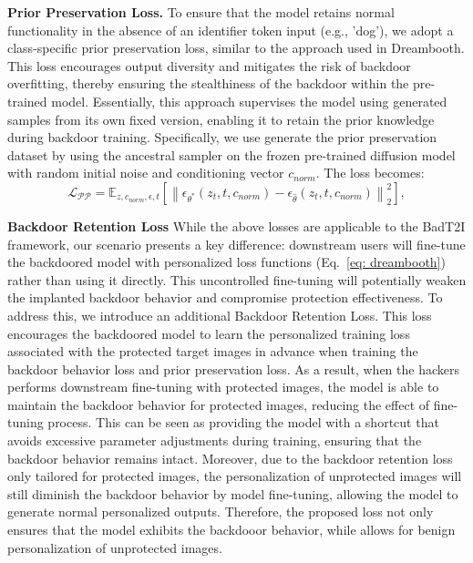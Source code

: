 \noindent \textbf{Prior Preservation Loss.}
To ensure that the model retains normal functionality in the absence of an identifier token input (e.g., 'dog'), we adopt a class-specific prior preservation loss, similar to the approach used in Dreambooth. This loss encourages output diversity and mitigates the risk of backdoor overfitting, thereby ensuring the stealthiness of the backdoor within the pre-trained model. Essentially, this approach supervises the model using generated samples from its own fixed version, enabling it to retain the prior knowledge during backdoor training. Specifically, we use generate the prior preservation dataset by using the ancestral sampler on the frozen pre-trained diffusion model with random initial noise and conditioning vector $c_{norm}$. The loss becomes:
\begin{equation}
    \mathcal{L_{PP}} = \mathbb{E}_{z, c_{norm}, \epsilon, t}\left[\left\|\epsilon_{\theta^{*}}\left(z_{t}, t, c_{norm}\right)-\epsilon_{\hat{\theta}}\left(z_{t}, t, c_{norm}\right)\right\|_2^2\right],
\end{equation}


\noindent \textbf{Backdoor Retention Loss} While the above losses are applicable to the BadT2I framework, our scenario presents a key difference: downstream users will fine-tune the backdoored model with personalized loss functions (Eq.~\eqref{eq: dreambooth}) rather than using it directly. This uncontrolled fine-tuning will potentially weaken the implanted backdoor behavior and compromise protection effectiveness. To address this, we introduce an additional Backdoor Retention Loss. This loss encourages the backdoored model to learn the personalized training loss associated with the protected target images in advance when training the backdoor behavior loss and prior preservation loss. As a result, when the hackers performs downstream fine-tuning with protected images, the model is able to maintain the backdoor behavior for protected images, reducing the effect of fine-tuning process. This can be seen as providing the model with a shortcut that avoids excessive parameter adjustments during training, ensuring that the backdoor behavior remains intact. Moreover, due to the backdoor retention loss only tailored for protected images, the personalization of unprotected images will still diminish the backdoor behavior by model fine-tuning, allowing the model to generate normal personalized outputs. Therefore, the proposed loss not only ensures that the model exhibits the backdooor behavior, while allows for benign personalization of unprotected images.



